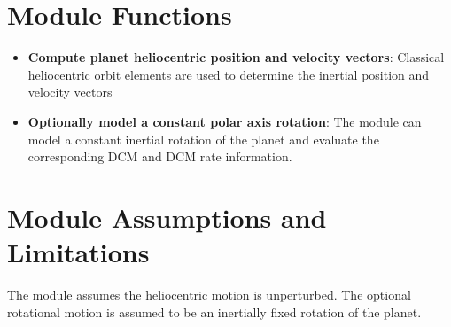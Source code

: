 

\section{Module Functions}
\begin{itemize}
	\item \textbf{Compute planet heliocentric position and velocity vectors}: Classical heliocentric orbit elements are used to determine the inertial position and velocity vectors
	\item \textbf{Optionally model a constant polar axis rotation}: The module can model a constant inertial rotation of the planet and evaluate the corresponding DCM and DCM rate information.
\end{itemize}

\section{Module Assumptions and Limitations}
The module assumes the heliocentric motion is unperturbed.  The optional rotational motion is assumed to be an inertially fixed rotation of the planet. 